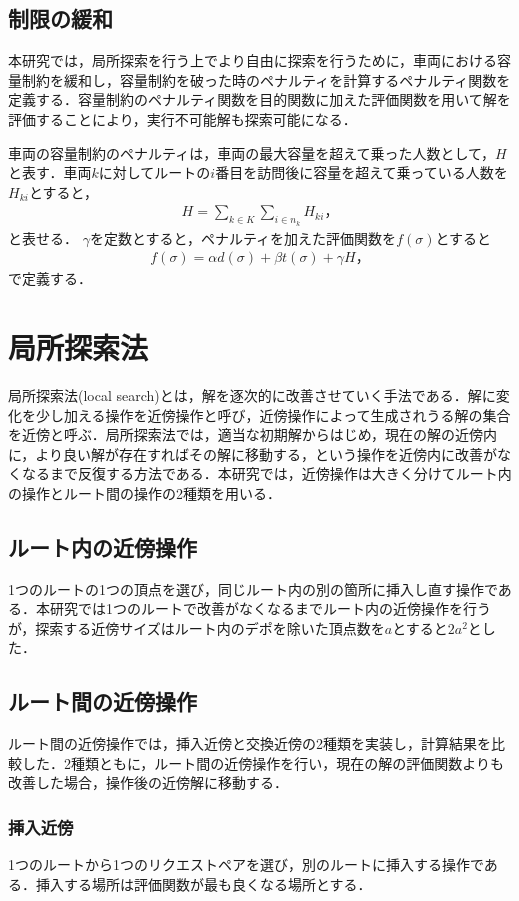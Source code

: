 \documentclass[a4j，11pt，twocolumn]{jsarticle}
\begin{document}
\subsection{{\large 制限の緩和}}
本研究では，局所探索を行う上でより自由に探索を行うために，車両における容量制約を緩和し，容量制約を破った時のペナルティを計算するペナルティ関数を定義する．容量制約のペナルティ関数を目的関数に加えた評価関数を用いて解を評価することにより，実行不可能解も探索可能になる．

車両の容量制約のペナルティは，車両の最大容量を超えて乗った人数として，$H$と表す．車両$k$に対してルートの$i$番目を訪問後に容量を超えて乗っている人数を$H_{ki}$とすると，
\begin{align*}
  H = \sum_{k \in K}\sum_{i \in n_k} H_{ki}，
\end{align*}
と表せる．
$\gamma$を定数とすると，ペナルティを加えた評価関数を$f(\sigma)$とすると
\begin{align*}
  f(\sigma) = \alpha d(\sigma)+ \beta t(\sigma) + \gamma H，
\end{align*}
で定義する．

\section{局所探索法}
局所探索法(local search)とは，解を逐次的に改善させていく手法である．解に変化を少し加える操作を近傍操作と呼び，近傍操作によって生成されうる解の集合を近傍と呼ぶ．局所探索法では，適当な初期解からはじめ，現在の解の近傍内に，より良い解が存在すればその解に移動する，という操作を近傍内に改善がなくなるまで反復する方法である．本研究では，近傍操作は大きく分けてルート内の操作とルート間の操作の2種類を用いる．

\subsection{ルート内の近傍操作}
1つのルートの1つの頂点を選び，同じルート内の別の箇所に挿入し直す操作である．本研究では1つのルートで改善がなくなるまでルート内の近傍操作を行うが，探索する近傍サイズはルート内のデポを除いた頂点数を$a$とすると$2a^2$とした．

\subsection{ルート間の近傍操作}
ルート間の近傍操作では，挿入近傍と交換近傍の2種類を実装し，計算結果を比較した．2種類ともに，ルート間の近傍操作を行い，現在の解の評価関数よりも改善した場合，操作後の近傍解に移動する．
\subsubsection{挿入近傍}
1つのルートから1つのリクエストペアを選び，別のルートに挿入する操作である．挿入する場所は評価関数が最も良くなる場所とする．
\end{document}
